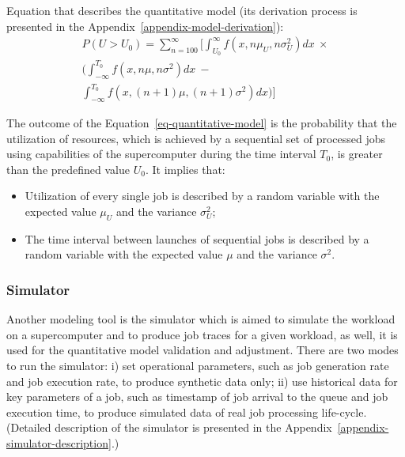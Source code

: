 Equation that describes the quantitative model (its derivation process is
presented in the Appendix~\ref{appendix-model-derivation}):
\begin{equation}
    \label{eq-quantitative-model}
    \begin{multlined}
    P(U > U_0) = \sum\limits_{n=100}^{\infty} 
                 \bigg[
                 \int_{U_0}^{\infty}f(x, n\mu_{U}, n\sigma_{U}^2)dx \
                 \times \\
                 \bigg( \int_{-\infty}^{T_0}f(x, n\mu, n\sigma^2)dx \  - \\
                 \int_{-\infty}^{T_0}f(x, (n+1)\mu, (n+1)\sigma^2)dx \bigg)
                 \bigg]
    \end{multlined}
\end{equation}

The outcome of the Equation~\ref{eq-quantitative-model} is the probability
that the utilization of resources, which is achieved by a sequential set of
processed jobs using capabilities of the supercomputer during the time
interval $T_0$, is greater than the predefined value $U_0$. It implies that:
\begin{itemize}
    \item Utilization of every single job is described by a random variable
    with the expected value $\mu_{U}$ and the variance $\sigma_{U}^2$;
    \item The time interval between launches of sequential jobs is described
    by a random variable with the expected value $\mu$ and the
    variance $\sigma^2$.
\end{itemize}

\subsubsection{Simulator}
\label{sec-strategy-2-2}

Another modeling tool is the simulator which is aimed to simulate the workload
on a supercomputer and to produce job traces for a given workload, as well,
it is used for the quantitative model validation and adjustment.
There are two modes to run the simulator:
i) set operational parameters, such as job generation rate and job execution
rate, to produce synthetic data only;
ii) use historical data for key parameters of a job, such as timestamp of job
arrival to the queue and job execution time, to produce simulated data of
real job processing life-cycle.
(Detailed description of the simulator is presented in the
Appendix~\ref{appendix-simulator-description}.)

